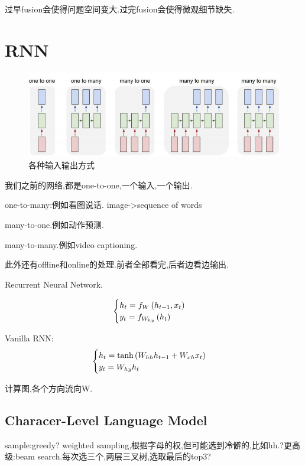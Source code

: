 	过早fusion会使得问题空间变大.过完fusion会使得微观细节缺失.
	
	\clearpage
	\section{RNN}
	\begin{figure}[htbp]
		\centering
		\includegraphics[scale=0.65]{figures/rnn-seqdata.png}
		\caption{各种输入输出方式}
		\label{}
	\end{figure}
	我们之前的网络,都是one-to-one,一个输入,一个输出.
	
	one-to-many:例如看图说话. image->sequence of words
	
	many-to-one.例如动作预测.
	
	many-to-many.例如video captioning.
	
	此外还有offline和online的处理.前者全部看完,后者边看边输出.
	
	Recurrent Neural Network.
	
	\begin{equation}
		\begin{cases}
			h_t = f_W\left( h_{t-1}, x_t\right)
			\\
			y_t = f_{W_{hy}}\left( h_t\right)
		\end{cases}
	\end{equation}

	Vanilla RNN:
	\begin{equation}
		\begin{cases}
			h_t = \tanh\left( W_{hh}h_{t-1} + W_{xh}x_t\right)
			\\
			y_t = W_{hy}h_t
		\end{cases}
	\end{equation}

	计算图,各个方向流向W.
	
	\subsection{Characer-Level Language Model}
	sample:greedy? weighted sampling,根据字母的权,但可能选到冷僻的,比如hh.?更高级:beam search.每次选三个,两层三叉树,选取最后的top3?
	
